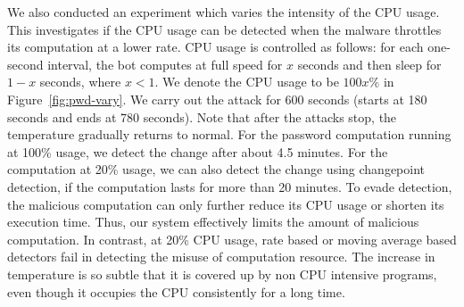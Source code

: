 %

We also conducted an experiment which varies the intensity of the
CPU usage. This investigates if the CPU usage can be detected when
the malware throttles its computation at a lower rate. CPU usage is
controlled as follows: for each one-second interval, the bot
computes at full speed for $x$ seconds and then sleep for $1-x$
seconds, where $x<1$. We denote the CPU usage to be $100x$\% in
Figure~\ref{fig:pwd-vary}. We carry out the attack for 600 seconds (starts
at 180 seconds and ends at 780 seconds).
Note that after the attacks
stop, the temperature gradually returns to normal.  For the password
computation running at 100\% usage, we detect the change after about
4.5 minutes.  For the computation at 20\% usage, we can also detect
the change using changepoint detection, if the computation lasts for more than 20 minutes. To
evade detection, the malicious computation can only further reduce
its CPU usage or shorten its execution time.
Thus, our system effectively limits the amount of malicious computation. In contrast, at 20\% CPU usage, 
rate based or moving average based detectors fail in detecting the misuse of computation resource. 
The increase in temperature is so subtle that it is covered up by non CPU intensive programs, even though it occupies the CPU consistently for a long time.
